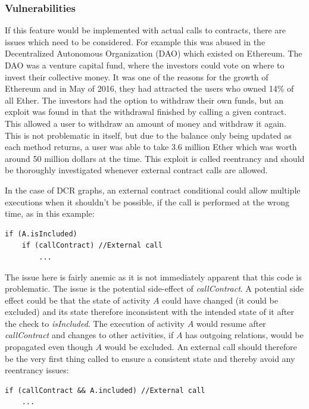 \documentclass{article}
\begin{document}
			\subsubsection{Vulnerabilities}

			If this feature would be implemented with actual calls to contracts, there are issues which need to be considered. 
			For example this was abused in the Decentralized Autonomous Organization (DAO) which existed on Ethereum.			
			The DAO was a venture capital fund, where the investors could vote on where to invest their collective money.
			It was one of the reasons for the growth of Ethereum and in May of 2016, they had attracted the users who owned 14\% of all Ether\cite{DAO}. 
			The investors had the option to withdraw their own funds, but an exploit was found in that the withdrawal finished by calling a given contract.
			This allowed a user to withdraw an amount of money and withdraw it again.
			This is not problematic in itself, but due to the balance only being updated as each method returns, a user was able to take 3.6 million Ether which was worth around 50 million dollars at the time.
			This exploit is called reentrancy and should be thoroughly investigated whenever external contract calls are allowed.

			In the case of DCR graphs, an external contract conditional could allow multiple executions when it shouldn't be possible, if the call is performed at the wrong time, as in this example:

			\begin{lstlisting}[language=pseudocode]
if (A.isIncluded)
	if (callContract) //External call
		...
			\end{lstlisting}

			The issue here is fairly anemic as it is not immediately apparent that this code is problematic.
			The issue is the potential side-effect of \emph{callContract}. 
			A potential side effect could be that the state of activity $A$ could have changed (it could be excluded) and its state therefore inconsistent with the intended state of it after the check to \emph{isIncluded}.
			The execution of activity $A$ would resume after \emph{callContract} and changes to other activities, if $A$ has outgoing relations, would be propagated even though $A$ would be excluded.  
			An external call should therefore be the very first thing called to ensure a consistent state and thereby avoid any reentrancy issues:

			\begin{lstlisting}[language=pseudocode]
if (callContract && A.included) //External call
	...
			\end{lstlisting}
\end{document}
